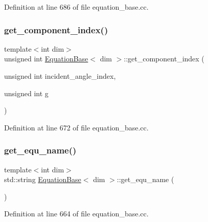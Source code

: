 Definition at line 686 of file equation\+\_\+base.\+cc.

\mbox{\label{class_equation_base_a03a5a22088edb15689e0041dcc6d323c}} 
\subsubsection{\texorpdfstring{get\+\_\+component\+\_\+index()}{get\_component\_index()}}
{\footnotesize\ttfamily template$<$int dim$>$ \\
unsigned int \hyperlink{class_equation_base}{Equation\+Base}$<$ dim $>$\+::get\+\_\+component\+\_\+index (\begin{DoxyParamCaption}\item[{unsigned int}]{incident\+\_\+angle\+\_\+index,  }\item[{unsigned int}]{g }\end{DoxyParamCaption})\hspace{0.3cm}{\ttfamily [virtual]}}



Definition at line 672 of file equation\+\_\+base.\+cc.

\mbox{\label{class_equation_base_abc4842a38ebb180b57ae11ec1325535c}} 
\subsubsection{\texorpdfstring{get\+\_\+equ\+\_\+name()}{get\_equ\_name()}}
{\footnotesize\ttfamily template$<$int dim$>$ \\
std\+::string \hyperlink{class_equation_base}{Equation\+Base}$<$ dim $>$\+::get\+\_\+equ\+\_\+name (\begin{DoxyParamCaption}{ }\end{DoxyParamCaption})}



Definition at line 664 of file equation\+\_\+base.\+cc.

\mbox{\label{class_equation_base_a7c46fc281a4040a89bbd97ccf0f46ac7}} 
